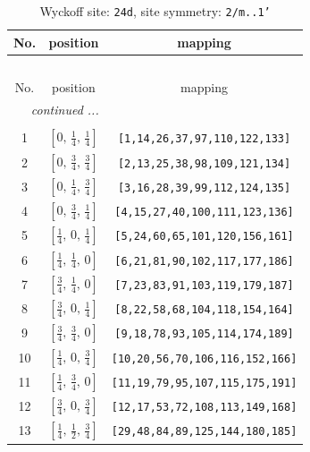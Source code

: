 \documentclass[fleqn,8pt]{jsarticle}
\begin{document}
\begin{longtable}{ccc}
\caption{Wyckoff site: {\tt 24d}, site symmetry: {\tt 2/m..1'}}
 \\
 \hline \hline
No. & position & mapping \\ \hline \endfirsthead

\multicolumn{2}{l}{\tablename\ \thetable{}} \\
 \hline \hline
No. & position & mapping \\ \hline \endhead

 \hline \hline
\multicolumn{2}{r}{\footnotesize\it continued ...} \\ \endfoot

 \hline \hline
\multicolumn{2}{r}{} \\ \endlastfoot

1 & $\left[ 0,\, \frac{1}{4},\, \frac{1}{4} \right]$ & {\tt [1,14,26,37,97,110,122,133]} \\ \hline
2 & $\left[ 0,\, \frac{3}{4},\, \frac{3}{4} \right]$ & {\tt [2,13,25,38,98,109,121,134]} \\ \hline
3 & $\left[ 0,\, \frac{1}{4},\, \frac{3}{4} \right]$ & {\tt [3,16,28,39,99,112,124,135]} \\ \hline
4 & $\left[ 0,\, \frac{3}{4},\, \frac{1}{4} \right]$ & {\tt [4,15,27,40,100,111,123,136]} \\ \hline
5 & $\left[ \frac{1}{4},\, 0,\, \frac{1}{4} \right]$ & {\tt [5,24,60,65,101,120,156,161]} \\ \hline
6 & $\left[ \frac{1}{4},\, \frac{1}{4},\, 0 \right]$ & {\tt [6,21,81,90,102,117,177,186]} \\ \hline
7 & $\left[ \frac{3}{4},\, \frac{1}{4},\, 0 \right]$ & {\tt [7,23,83,91,103,119,179,187]} \\ \hline
8 & $\left[ \frac{3}{4},\, 0,\, \frac{1}{4} \right]$ & {\tt [8,22,58,68,104,118,154,164]} \\ \hline
9 & $\left[ \frac{3}{4},\, \frac{3}{4},\, 0 \right]$ & {\tt [9,18,78,93,105,114,174,189]} \\ \hline
10 & $\left[ \frac{1}{4},\, 0,\, \frac{3}{4} \right]$ & {\tt [10,20,56,70,106,116,152,166]} \\ \hline
11 & $\left[ \frac{1}{4},\, \frac{3}{4},\, 0 \right]$ & {\tt [11,19,79,95,107,115,175,191]} \\ \hline
12 & $\left[ \frac{3}{4},\, 0,\, \frac{3}{4} \right]$ & {\tt [12,17,53,72,108,113,149,168]} \\ \hline
13 & $\left[ \frac{1}{4},\, \frac{1}{2},\, \frac{3}{4} \right]$ & {\tt [29,48,84,89,125,144,180,185]} \\ \hline

\end{longtable}
\end{document}
